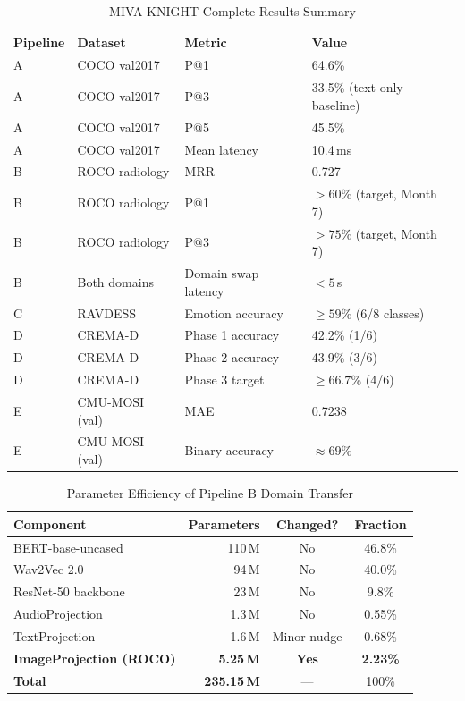 \documentclass[12pt,a4paper]{article}
\theoremstyle{definition}
\theoremstyle{plain}
\theoremstyle{remark}
\begin{document}
\begin{table}[H]
\centering
\caption{MIVA-KNIGHT Complete Results Summary}
\renewcommand{\arraystretch}{1.2}
\begin{tabular}{llll}
\toprule
\textbf{Pipeline} & \textbf{Dataset} & \textbf{Metric} & \textbf{Value} \\
\midrule
A & COCO val2017 & P@1 & 64.6\% \\
A & COCO val2017 & P@3 & 33.5\% (text-only baseline) \\
A & COCO val2017 & P@5 & 45.5\% \\
A & COCO val2017 & Mean latency & 10.4\,ms \\
\midrule
B & ROCO radiology & MRR & 0.727 \\
B & ROCO radiology & P@1 & $> 60\%$ (target, Month 7) \\
B & ROCO radiology & P@3 & $> 75\%$ (target, Month 7) \\
B & Both domains & Domain swap latency & $< 5$\,s \\
\midrule
C & RAVDESS & Emotion accuracy & $\geq 59\%$ (6/8 classes) \\
\midrule
D & CREMA-D & Phase 1 accuracy & 42.2\% (1/6) \\
D & CREMA-D & Phase 2 accuracy & 43.9\% (3/6) \\
D & CREMA-D & Phase 3 target & $\geq 66.7\%$ (4/6) \\
\midrule
E & CMU-MOSI (val) & MAE & 0.7238 \\
E & CMU-MOSI (val) & Binary accuracy & $\approx 69\%$ \\
\bottomrule
\end{tabular}
\end{table}

\begin{table}[H]
\centering
\caption{Parameter Efficiency of Pipeline B Domain Transfer}
\begin{tabular}{lrcc}
\toprule
\textbf{Component} & \textbf{Parameters} & \textbf{Changed?} & \textbf{Fraction} \\
\midrule
BERT-base-uncased & 110\,M & No & 46.8\% \\
Wav2Vec 2.0 & 94\,M & No & 40.0\% \\
ResNet-50 backbone & 23\,M & No & 9.8\% \\
AudioProjection & 1.3\,M & No & 0.55\% \\
TextProjection & 1.6\,M & Minor nudge & 0.68\% \\
\rowcolor{boxorange}\textbf{ImageProjection (ROCO)} & \textbf{5.25\,M} & \textbf{Yes} & \textbf{2.23\%} \\
\midrule
\textbf{Total} & \textbf{235.15\,M} & --- & 100\% \\
\bottomrule
\end{tabular}
\end{table}
\end{document}
